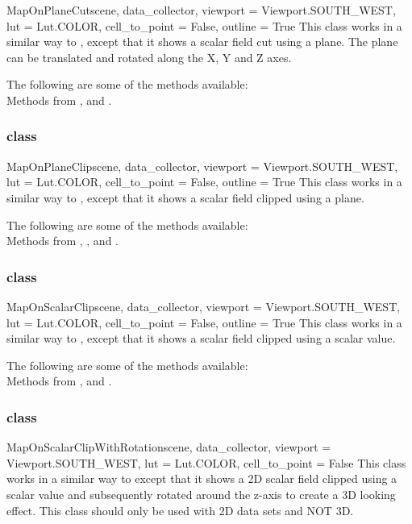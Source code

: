 \begin{classdesc}{MapOnPlaneCut}{scene, data_collector, 
viewport = Viewport.SOUTH_WEST, lut = Lut.COLOR, cell_to_point = False, 
outline = True}
This class works in a similar way to \Map, except that it shows a scalar 
field cut using a plane. The plane can be translated and rotated along the 
X, Y and Z axes.
\end{classdesc}

The following are some of the methods available:\\
Methods from \ActorThreeD, \Transform and \DataSetMapper.

\subsubsection{\MapOnPlaneClip class}

\begin{classdesc}{MapOnPlaneClip}{scene, data_collector,
viewport = Viewport.SOUTH_WEST, lut = Lut.COLOR, cell_to_point = False, 
outline = True}
This class works in a similar way to \MapOnPlaneCut, except that it shows a 
scalar field clipped using a plane. 
\end{classdesc}

The following are some of the methods available:\\
Methods from \ActorThreeD, \Transform, \Clipper and \DataSetMapper.

\subsubsection{\MapOnScalarClip class}

\begin{classdesc}{MapOnScalarClip}{scene, data_collector, 
viewport = Viewport.SOUTH_WEST, lut = Lut.COLOR, cell_to_point = False, 
outline = True}
This class works in a similar way to \Map, except that it shows a scalar 
field clipped using a scalar value. 
\end{classdesc}

The following are some of the methods available:\\
Methods from \ActorThreeD, \Clipper and \DataSetMapper.

\subsubsection{\MapOnScalarClipWithRotation class}

\begin{classdesc}{MapOnScalarClipWithRotation}{scene, data_collector, 
viewport = Viewport.SOUTH_WEST, lut = Lut.COLOR, cell_to_point = False}
This class works in a similar way to \Map except that it
shows a 2D scalar field clipped using a scalar value and subsequently
rotated around the z-axis to create a  3D looking effect. This class should
only be used with 2D data sets and NOT 3D.
\end{classdesc}

